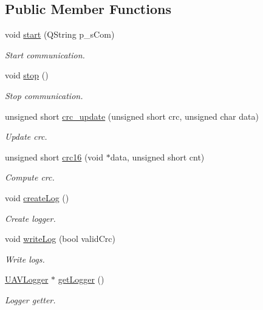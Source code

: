 \subsection*{Public Member Functions}
\begin{DoxyCompactItemize}
\item 
void \hyperlink{class_communication_control_a321f1c016de4d9d93695293e0c252687}{start} (Q\-String p\-\_\-s\-Com)
\begin{DoxyCompactList}\small\item\em Start communication. \end{DoxyCompactList}\item 
void \hyperlink{class_communication_control_a32500cfca501e4836b9c1ed84350d5c6}{stop} ()
\begin{DoxyCompactList}\small\item\em Stop communication. \end{DoxyCompactList}\item 
unsigned short \hyperlink{class_communication_control_a6be2f8c60b546565945cf4da6c192eb3}{crc\-\_\-update} (unsigned short crc, unsigned char data)
\begin{DoxyCompactList}\small\item\em Update crc. \end{DoxyCompactList}\item 
unsigned short \hyperlink{class_communication_control_a281d00c02b2292c08464c5af903be47b}{crc16} (void $\ast$data, unsigned short cnt)
\begin{DoxyCompactList}\small\item\em Compute crc. \end{DoxyCompactList}\item 
void \hyperlink{class_communication_control_a7690c208374a6cff17076d6c551afb65}{create\-Log} ()
\begin{DoxyCompactList}\small\item\em Create logger. \end{DoxyCompactList}\item 
void \hyperlink{class_communication_control_ad4ea576e660f4a5ba5cd7b3985f08315}{write\-Log} (bool valid\-Crc)
\begin{DoxyCompactList}\small\item\em Write logs. \end{DoxyCompactList}\item 
\hyperlink{class_u_a_v_logger}{U\-A\-V\-Logger} $\ast$ \hyperlink{class_communication_control_a4e67a1c26ccce71563343763f639c30f}{get\-Logger} ()
\begin{DoxyCompactList}\small\item\em Logger getter. \end{DoxyCompactList}\end{DoxyCompactItemize}
